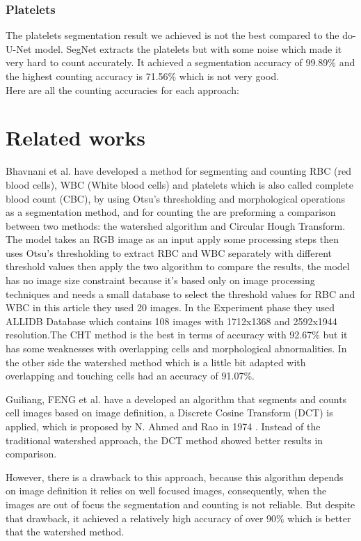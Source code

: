 \documentclass[conference]{IEEEtran}
\begin{document}
\subsubsection{Platelets}
\hspace{\parindent}
The platelets segmentation result we achieved is not the best compared to the do-U-Net model. SegNet extracts the platelets but with some noise which made it very hard to count accurately.
It achieved a segmentation accuracy of 99.89\% and the highest counting accuracy is 71.56\% which is not very good.\\
Here are all the counting accuracies for each approach:

\section{Related works}
Bhavnani et al. \cite{bhavnani2016segmentation} have developed a method for segmenting and counting RBC (red blood cells), WBC (White blood cells) and platelets which is also called complete blood count (CBC), by using Otsu’s thresholding and morphological operations as a segmentation method, and for counting the are preforming a comparison between two methods: the watershed algorithm and Circular Hough Transform. The model takes an RGB image as an input apply some processing steps then uses Otsu's thresholding to extract RBC and WBC separately with different threshold values then apply the two algorithm to compare the results, the model has no image size constraint because it's based only on image processing techniques and needs a small database to select the threshold values for RBC and WBC in this article they used 20 images. In the Experiment phase they used ALLIDB Database which contains 108 images with 1712x1368 and 2592x1944 resolution.The CHT method is the best in terms of accuracy with 92.67\% but it has some weaknesses with overlapping cells and morphological abnormalities. In the other side the watershed method which is a little bit adapted with overlapping and touching cells had an accuracy of 91.07\%.\

Guiliang, FENG et al.\cite{guiliang2016microscopic} have a developed an algorithm that segments and counts cell images based on image definition, a Discrete Cosine Transform (DCT) is applied, which is proposed by N. Ahmed and Rao in 1974 \cite{ahmed1974discrete}. Instead of the traditional watershed approach, the DCT method showed better results in comparison.\

However, there is a drawback to this approach, because this algorithm depends on image definition it relies on well focused images, consequently, when the images are out of focus the segmentation and counting is not reliable. But despite that drawback, it achieved a relatively high accuracy of over 90\% which is better that the watershed method.\\
\end{document}
